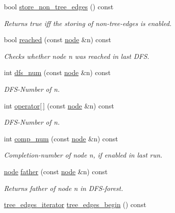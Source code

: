 \begin{DoxyCompactItemize}
bool \mbox{\hyperlink{classdfs_a6ac1f01ff594fbbc6e8d6b5bd03fc9ab}{store\+\_\+non\+\_\+tree\+\_\+edges}} () const
\begin{DoxyCompactList}\small\item\em Returns true iff the storing of non-\/tree-\/edges is enabled. \end{DoxyCompactList}\item 
bool \mbox{\hyperlink{classdfs_a2948061eb1ea02f57614f9044c8e63cf}{reached}} (const \mbox{\hyperlink{classnode}{node}} \&n) const
\begin{DoxyCompactList}\small\item\em Checks whether node {\itshape n} was reached in last D\+FS. \end{DoxyCompactList}\item 
int \mbox{\hyperlink{classdfs_a315f16831a0bd333960e87e045cb37c8}{dfs\+\_\+num}} (const \mbox{\hyperlink{classnode}{node}} \&n) const
\begin{DoxyCompactList}\small\item\em D\+F\+S-\/\+Number of {\itshape n}. \end{DoxyCompactList}\item 
int \mbox{\hyperlink{classdfs_a014b90894a47fa5abb7f4e5030be2c3e}{operator\mbox{[}$\,$\mbox{]}}} (const \mbox{\hyperlink{classnode}{node}} \&n) const
\begin{DoxyCompactList}\small\item\em D\+F\+S-\/\+Number of {\itshape n}. \end{DoxyCompactList}\item 
int \mbox{\hyperlink{classdfs_aceb066c806cb0beb5688b167a17387c7}{comp\+\_\+num}} (const \mbox{\hyperlink{classnode}{node}} \&n) const
\begin{DoxyCompactList}\small\item\em Completion-\/number of node {\itshape n}, if enabled in last run. \end{DoxyCompactList}\item 
\mbox{\hyperlink{classnode}{node}} \mbox{\hyperlink{classdfs_a3012717ce541b3e56943e2c2c50efdf6}{father}} (const \mbox{\hyperlink{classnode}{node}} \&n) const
\begin{DoxyCompactList}\small\item\em Returns father of node {\itshape n} in D\+F\+S-\/forest. \end{DoxyCompactList}\item 
\mbox{\hyperlink{classdfs_accde8d5403404f6d22fe4756d4ffedd5}{tree\+\_\+edges\+\_\+iterator}} \mbox{\hyperlink{classdfs_afe193938a05b114870c19163731273c8}{tree\+\_\+edges\+\_\+begin}} () const

\end{DoxyCompactItemize}
